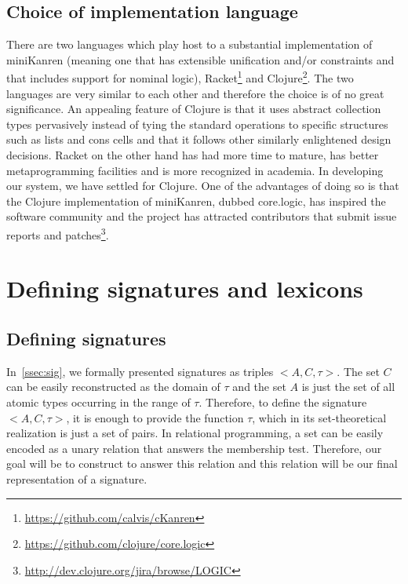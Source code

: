 \subsection{Choice of implementation language}

There are two languages which play host to a substantial implementation
of miniKanren (meaning one that has extensible unification and/or
constraints and that includes support for nominal logic),
Racket\footnote{\url{https://github.com/calvis/cKanren}} and
Clojure\footnote{\url{https://github.com/clojure/core.logic}}. The two
languages are very similar to each other and therefore the choice is of
no great significance. An appealing feature of Clojure is that it uses
abstract collection types pervasively instead of tying the standard
operations to specific structures such as lists and cons cells and that
it follows other similarly enlightened design decisions. Racket on the
other hand has had more time to mature, has better metaprogramming
facilities and is more recognized in academia. In developing our system,
we have settled for Clojure. One of the advantages of doing so is that
the Clojure implementation of miniKanren, dubbed core.logic, has
inspired the software community and the project has attracted
contributors that submit issue reports and
patches\footnote{\url{http://dev.clojure.org/jira/browse/LOGIC}}.


\section{Defining signatures and lexicons}

\subsection{Defining signatures}

In~\ref{ssec:sig}, we formally presented signatures as triples
$\mathopen{<}A, C, \tau\mathclose{>}$. The set $C$ can be easily
reconstructed as the domain of $\tau$ and the set $A$ is just the set of
all atomic types occurring in the range of $\tau$. Therefore, to define
the signature $\mathopen{<}A, C, \tau\mathclose{>}$, it is enough to
provide the function $\tau$, which in its set-theoretical realization is
just a set of pairs. In relational programming, a set can be easily
encoded as a unary relation that answers the membership test. Therefore,
our goal will be to construct to answer this relation and this relation
will be our final representation of a signature.


